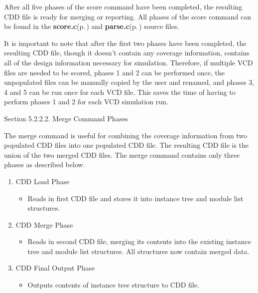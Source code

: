 \begin{Desc}
\item[]After all five phases of the score command have been completed, the resulting CDD file is ready for merging or reporting. All phases of the score command can be found in the {\bf score.c}{\rm (p.\,\pageref{score_8c})} and {\bf parse.c}{\rm (p.\,\pageref{parse_8c})} source files.\end{Desc}
\begin{Desc}
\item[]It is important to note that after the first two phases have been completed, the resulting CDD file, though it doesn't contain any coverage information, contains all of the design information necessary for simulation. Therefore, if multiple VCD files are needed to be scored, phases 1 and 2 can be performed once, the unpopulated files can be manually copied by the user and renamed, and phases 3, 4 and 5 can be run once for each VCD file. This saves the time of having to perform phases 1 and 2 for each VCD simulation run.\end{Desc}
\begin{Desc}
\item[Section 5.2.2.2. Merge Command Phases]\end{Desc}
\begin{Desc}
\item[]The merge command is useful for combining the coverage information from two populated CDD files into one populated CDD file. The resulting CDD file is the union of the two merged CDD files. The merge command contains only three phases as described below.\end{Desc}
\begin{Desc}
\item[]\begin{enumerate}
\item CDD Load Phase \begin{itemize}
\item Reads in first CDD file and stores it into instance tree and module list structures. \end{itemize}
\item CDD Merge Phase \begin{itemize}
\item Reads in second CDD file, merging its contents into the existing instance tree and module list structures. All structures now contain merged data. \end{itemize}
\item CDD Final Output Phase \begin{itemize}
\item Outputs contents of instance tree structure to CDD file. \end{itemize}
\end{enumerate}
\end{Desc}
